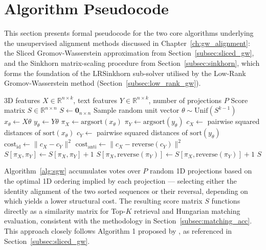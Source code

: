 \section{Algorithm Pseudocode}
\label{sec:app_pseudocode}

This section presents formal pseudocode for the two core algorithms underlying the unsupervised alignment methods discussed in Chapter~\ref{ch:gw_alignment}: the Sliced Gromov-Wasserstein approximation from Section~\ref{subsec:sliced_gw}, and the Sinkhorn matrix-scaling procedure from Section~\ref{subsec:sinkhorn}, which forms the foundation of the LRSinkhorn sub-solver utilised by the Low-Rank Gromov-Wasserstein method (Section~\ref{subsec:low_rank_gw}).

\begin{algorithm}[H]
\caption{Sliced Gromov-Wasserstein (SGW) Score Accumulation}
\label{alg:sgw}
\begin{algorithmic}[1]
\Require 3D features $X \in \mathbb{R}^{n \times k}$, text features $Y \in \mathbb{R}^{n \times k}$, number of projections $P$
\Ensure Score matrix $S \in \mathbb{R}^{n \times n}$
\State $S \gets \mathbf{0}_{n \times n}$
\State Sample random unit vector $\theta \sim \mathrm{Unif}(S^{k-1})$
\State $x_\theta \gets X \theta$ 
\State $y_\theta \gets Y \theta$
\State $\pi_X \gets \mathrm{argsort}(x_\theta)$ 
\State $\pi_Y \gets \mathrm{argsort}(y_\theta)$
\State $c_X \gets$ pairwise squared distances of $\mathrm{sort}(x_\theta)$
\State $c_Y \gets$ pairwise squared distances of $\mathrm{sort}(y_\theta)$
\State $\mathrm{cost}_{\mathrm{id}} \gets \| c_X - c_Y \|^2$
\State $\mathrm{cost}_{\mathrm{anti}} \gets \| c_X - \mathrm{reverse}(c_Y) \|^2$
\State $S[\pi_X, \pi_Y] \gets S[\pi_X, \pi_Y] + 1$
\Else
\State $S[\pi_X, \mathrm{reverse}(\pi_Y)] \gets S[\pi_X, \mathrm{reverse}(\pi_Y)] + 1$
\EndIf
\EndFor
\State \Return $S$
\end{algorithmic}
\end{algorithm}

Algorithm~\ref{alg:sgw} accumulates votes over $P$ random 1D projections based on the optimal 1D ordering implied by each projection --- selecting either the identity alignment of the two sorted sequences or their reversal, depending on which yields a lower structural cost. The resulting score matrix $S$ functions directly as a similarity matrix for Top-$K$ retrieval and Hungarian matching evaluation, consistent with the methodology in Section~\ref{subsec:matching_acc}. This approach closely follows Algorithm 1 proposed by \textcite{vayer2019optimal}, as referenced in Section~\ref{subsec:sliced_gw}.


